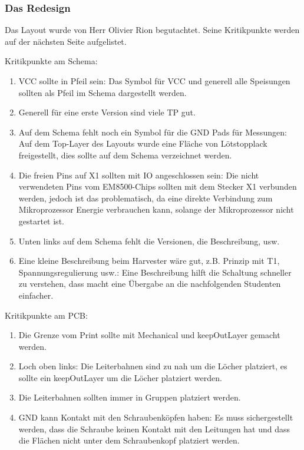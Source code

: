 \subsubsection{Das Redesign}

Das Layout wurde von Herr Olivier Rion begutachtet. Seine Kritikpunkte werden auf der nächsten Seite aufgelistet.

\newpage
\begin{minipage}{1\textwidth}

Kritikpunkte am Schema:
\begin{enumerate}
    \item VCC sollte in Pfeil sein: Das Symbol für VCC und generell alle Speisungen sollten als Pfeil im Schema dargestellt werden.
    \item Generell für eine erste Version sind viele TP gut.
    \item Auf dem Schema fehlt noch ein Symbol für die GND Pads für Messungen: Auf dem Top-Layer des Layouts wurde eine Fläche von Lötstopplack freigestellt, dies sollte auf dem Schema verzeichnet werden.
	\item Die freien Pins auf X1 sollten mit IO angeschlossen sein: Die nicht verwendeten Pins vom EM8500-Chips sollten mit dem Stecker X1 verbunden werden, jedoch ist das problematisch, da eine direkte Verbindung zum Mikroprozessor Energie verbrauchen kann, solange der Mikroprozessor nicht gestartet ist.
	\item Unten links auf dem Schema fehlt die Versionen, die Beschreibung, usw.
	\item Eine kleine Beschreibung beim Harvester wäre gut, z.B. Prinzip mit T1, Spannungsregulierung usw.: Eine Beschreibung hilft die Schaltung schneller zu verstehen, dass macht eine Übergabe an die nachfolgenden Studenten einfacher.
\end{enumerate}


Kritikpunkte am PCB:
\begin{enumerate}
    \item Die Grenze vom Print sollte mit Mechanical und keepOutLayer gemacht werden.
    \item Loch oben links: Die Leiterbahnen sind zu nah um die Löcher platziert, es sollte ein keepOutLayer um die Löcher platziert werden.
    \item Die Leiterbahnen sollten immer in Gruppen platziert werden.
	\item GND kann Kontakt mit den Schraubenköpfen haben: Es muss sichergestellt werden, dass die Schraube keinen Kontakt mit den Leitungen hat und dass die Flächen nicht unter dem Schraubenkopf platziert werden. 
\end{enumerate}


\end{minipage}
